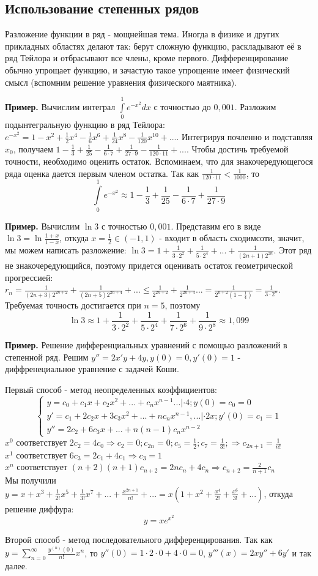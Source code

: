 \subsection{Использование степенных рядов}
Разложение функции в ряд - мощнейшая тема. Иногда в физике и других прикладных
областях делают так: берут сложную функцию, раскладывают её в ряд Тейлора и 
отбрасывают все члены, кроме первого. Дифференцирование обычно упрощает 
функцию, и зачастую такое упрощение имеет физический смысл (вспомним 
решение уравнения физического маятника).

\textbf{Пример.} Вычислим интеграл
$\int\limits_{0}^{1}e^{-x^2}dx$ с точностью до $0,001$. 
Разложим подынтегральную функцию в ряд Тейлора:
$e^{-x^2}=1-x^2+\frac{1}{2}x^4-\frac{1}{6}x^6+\frac{1}{24}x^8-
\frac{1}{120}x^{10}+...$. Интегрируя почленно и подставляя $x_0$, получаем 
$1-\frac{1}{3}+\frac{1}{25}-\frac{1}{6\cdot 7}+\frac{1}{27\cdot 9}-
\frac{1}{120\cdot 11}+...$. Чтобы достичь требуемой точности, необходимо
оценить остаток. Вспоминаем, что для знакочередующегося ряда оценка
дается первым членом остатка. Так как $\frac{1}{120\cdot 11}<\frac{1}{1000}$,
то $$\int\limits_{0}^{1}e^{-x^2}\approx
1-\frac{1}{3}+\frac{1}{25}-\frac{1}{6\cdot 7}+\frac{1}{27\cdot 9}$$

\textbf{Пример.} Вычислим $\ln3$ с точностью $0,001$. Представим его в виде
 $\ln3=\ln\frac{1+x}{1-x}$, откуда $x=\frac{1}{2}\in(-1,1)$ - входит
 в область сходимсоти, значит, мы можем написать разложение: 
 $\ln{3}=1+\frac{1}{3\cdot 2^2}+\frac{1}{5\cdot 2^4}+...+
 \frac{1}{(2n+1)2^{2n}}$. Этот ряд не знакочередующийся, поэтому
 придется оценивать остаток геометрической прогрессией:
 $r_n=\frac{1}{(2n+3)2^{2n+2}}+\frac{1}{(2n+5)2^{2n+4}}+...\leqslant 
 \frac{1}{2^{2n+2}}+\frac{1}{2^{2n+4}}...=\frac{1}{2^{n+2}(1-\frac{1}{4})}=
 \frac{1}{3\cdot 2^n}$. Требуемая точность достигается при $n=5$, поэтому
$$\ln 3\approx 1+\frac{1}{3\cdot 2^2}+\frac{1}{5\cdot 2^4}+
\frac{1}{7\cdot 2^6}+\frac{1}{9\cdot 2^8}\approx 1,099$$

\textbf{Пример.} Решение дифференциальных уравнений с помощью разложений в 
степенной ряд. Решим $y'' = 2x'y + 4y, y(0) = 0 , y'(0)=1$ -
диффренециальное уравнение с задачей Коши. 

Первый способ - метод неопределенных коэффициентов:
$$\begin{cases}
y = c_0 + c_1x + c_2x^2 + ... + c_nx^{n-1} ... |\cdot  4; y(0) = c_0 = 0\\
y' = c_1 + 2c_2x + 3c_3x^2+...+nc_nx^{n-1}, ... |\cdot  2x; y'(0)=c_1=1\\
y'' = 2c_2 + 6c_3x + ... + n(n-1)c_nx^{n-2}
\end{cases}$$
$x^0$ соответствует $2c_2=4c_0 \Rightarrow c_2 = 0; c_{2n} = 0; c_5 = 
\frac{1}{2};
c_7 = \frac{1}{3!}; \Rightarrow c_{2n+1} = \frac{1}{n!}$\\
$x^1$ соответствует $6c_3 = 2c_1 + 4 c_1 \Rightarrow c_3 = 1$\\
$x^n$ соответствует $(n+2)(n+1)c_{n+2} = 2nc_n + 4c_n \Rightarrow c_{n+2} = 
\frac{2}{n+1}c_n$\\
Мы получили 
$y = x + x^3 + \frac{1}{2!}x^5 + \frac{1}{3!}x^7 + ... + \frac{x^{2n+1}}{n!}
+ ... = x(1+x^2+\frac{x^4}{2!} + \frac{x^6}{3!}+...)$,
откуда решение диффура: 
$$y = xe^{x^2}$$

Второй способ - метод последовательного дифференцирования. 
Так как $y=\sum\limits_{n=0}^{\infty} \frac{y^{(n)}(0)}{n!}x^n$, 
то $y''(0)=1\cdot 2\cdot 0+4\cdot 0=0$, $y'''(x)=2xy''+6y'$ и так далее. 


